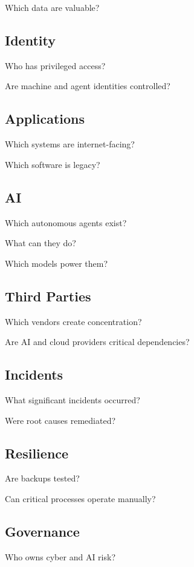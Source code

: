 Which data are valuable?

\subsection{Identity}

Who has privileged access?

Are machine and agent identities controlled?

\subsection{Applications}

Which systems are internet-facing?

Which software is legacy?

\subsection{AI}

Which autonomous agents exist?

What can they do?

Which models power them?

\subsection{Third Parties}

Which vendors create concentration?

Are AI and cloud providers critical dependencies?

\subsection{Incidents}

What significant incidents occurred?

Were root causes remediated?

\subsection{Resilience}

Are backups tested?

Can critical processes operate manually?

\subsection{Governance}

Who owns cyber and AI risk?

